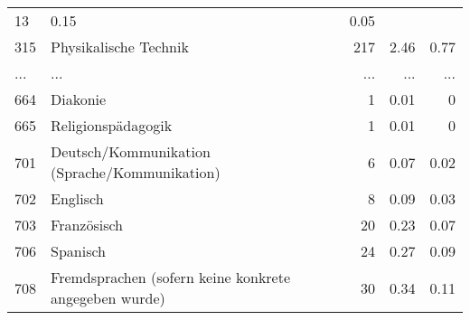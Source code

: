 \begin{longtable}{lXrrr}
          \num{13} &
          \num[round-mode=places,round-precision=2]{0,15} &
          \num[round-mode=places,round-precision=2]{0,05} \\
        315 & \multicolumn{1}{X}{Physikalische Technik} & %
          \num{217} &
          \num[round-mode=places,round-precision=2]{2,46} &
          \num[round-mode=places,round-precision=2]{0,77} \\
       ... & ... & ... & ... & ... \\
        664 & \multicolumn{1}{X}{Diakonie} & %
          \num{1} &
          \num[round-mode=places,round-precision=2]{0,01} &
          \num[round-mode=places,round-precision=2]{0} \\

        665 & \multicolumn{1}{X}{Religionspädagogik} & %
          \num{1} &
          \num[round-mode=places,round-precision=2]{0,01} &
          \num[round-mode=places,round-precision=2]{0} \\

        701 & \multicolumn{1}{X}{Deutsch/Kommunikation (Sprache/Kommunikation)} & %
          \num{6} &
          \num[round-mode=places,round-precision=2]{0,07} &
          \num[round-mode=places,round-precision=2]{0,02} \\

        702 & \multicolumn{1}{X}{Englisch} & %
          \num{8} &
          \num[round-mode=places,round-precision=2]{0,09} &
          \num[round-mode=places,round-precision=2]{0,03} \\

        703 & \multicolumn{1}{X}{Französisch} & %
          \num{20} &
          \num[round-mode=places,round-precision=2]{0,23} &
          \num[round-mode=places,round-precision=2]{0,07} \\

        706 & \multicolumn{1}{X}{Spanisch} & %
          \num{24} &
          \num[round-mode=places,round-precision=2]{0,27} &
          \num[round-mode=places,round-precision=2]{0,09} \\

        708 & \multicolumn{1}{X}{Fremdsprachen (sofern keine konkrete angegeben wurde)} & %
          \num{30} &
          \num[round-mode=places,round-precision=2]{0,34} &
          \num[round-mode=places,round-precision=2]{0,11} \\


\end{longtable}

